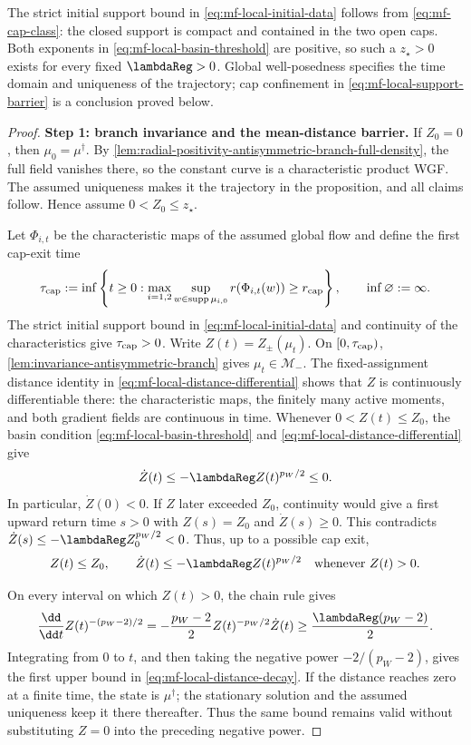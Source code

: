 The strict initial support bound in \cref{eq:mf-local-initial-data} follows
from \cref{eq:mf-cap-class}: the closed support is compact and contained in
the two open caps. Both exponents in \cref{eq:mf-local-basin-threshold} are
positive, so such a \(z_\star>0\) exists for every fixed
\(\lambdaReg>0\). Global well-posedness specifies the time domain and
uniqueness of the trajectory; cap confinement in
\cref{eq:mf-local-support-barrier} is a conclusion proved below.

\begin{proof}
\par\noindent\textbf{Step 1: branch invariance and the mean-distance barrier.}
If \(Z_0=0\), then \(\mu_0=\mu^\dagger\). By
\cref{lem:radial-positivity-antisymmetric-branch-full-density}, the full field
vanishes there, so the constant curve is a characteristic product WGF.
The assumed uniqueness makes it the trajectory in the proposition, and all
claims follow. Hence assume \(0<Z_0\le z_\star\).

Let $\Phi_{i,t}$ be the characteristic maps of the assumed global flow and
define the first cap-exit time
\[
 \tau_{\rm cap}:=\inf\left\{t\ge0:
  \max_{i=1,2}\sup_{w\in\operatorname{supp}\mu_{i,0}}
  r(\Phi_{i,t}(w))\ge r_{\rm cap}\right\},
 \qquad \inf\varnothing:=\infty.
\]
The strict initial support bound in \cref{eq:mf-local-initial-data} and
continuity of the characteristics give $\tau_{\rm cap}>0$.
Write \(Z(t)=Z_\pm(\mu_t)\). On $[0,\tau_{\rm cap})$,
\cref{lem:invariance-antisymmetric-branch} gives
\(\mu_t\in\mathcal M_-\). The fixed-assignment distance identity in
\cref{eq:mf-local-distance-differential} shows that \(Z\) is continuously
differentiable there: the characteristic maps, the finitely many active
moments, and both gradient fields are continuous in time.
Whenever \(0<Z(t)\le Z_0\), the basin condition
\cref{eq:mf-local-basin-threshold} and
\cref{eq:mf-local-distance-differential} give
\begin{equation}
\label{eq:mf-distance-decay-differential}
 \dot Z(t)\le-\lambdaReg Z(t)^{p_W/2}\le0.
\end{equation}
In particular, \(\dot Z(0)<0\). If \(Z\) later exceeded \(Z_0\), continuity
would give a first upward return time \(s>0\) with \(Z(s)=Z_0\) and
\(\dot Z(s)\ge0\). This contradicts
\(\dot Z(s)\le-\lambdaReg Z_0^{p_W/2}<0\). Thus, up to a possible cap exit,
\[
 Z(t)\le Z_0,
 \qquad
 \dot Z(t)\le-\lambdaReg Z(t)^{p_W/2}
 \quad\text{whenever }Z(t)>0.
\]

On every interval on which \(Z(t)>0\), the chain rule gives
\[
 \frac{\dd}{\dd t}Z(t)^{-(p_W-2)/2}
 =-\frac{p_W-2}{2}Z(t)^{-p_W/2}\dot Z(t)
 \ge\frac{\lambdaReg(p_W-2)}2.
\]
Integrating from \(0\) to \(t\), and then taking the negative power
\(-2/(p_W-2)\), gives the first upper bound in
\cref{eq:mf-local-distance-decay}. If the distance reaches zero at a finite
time, the state is \(\mu^\dagger\); the stationary solution and the assumed
uniqueness keep it there thereafter. Thus the same bound remains valid without
substituting \(Z=0\) into the preceding negative power.


\end{proof}
